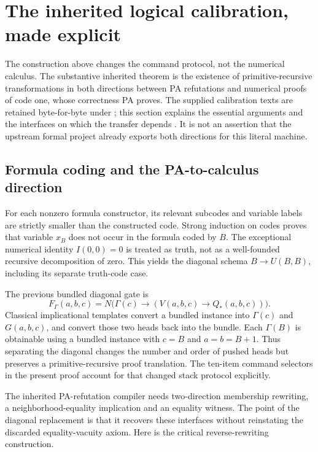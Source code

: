 \section{The inherited logical calibration, made explicit}
\label{sec:calibration}

The construction above changes the command protocol, not the numerical
calculus. The substantive inherited theorem is the existence of
primitive-recursive transformations in both directions between PA
refutations and numerical proofs of code one, whose correctness PA proves.
The supplied calibration texts are retained byte-for-byte under
; this section explains the essential arguments
and the interfaces on which the transfer depends \cite{pa195,pa194,gammad}.
It is not an assertion that the upstream formal project already exports
both directions for this literal machine.

\subsection{Formula coding and the PA-to-calculus direction}

For each nonzero formula constructor, its relevant subcodes and variable
labels are strictly smaller than the constructed code. Strong induction
on codes proves that variable $x_B$ does not occur in the formula coded
by $B$. The exceptional numerical identity $I(0,0)=0$ is treated as truth,
not as a well-founded recursive decomposition of zero. This yields the
diagonal schema $B\to U(B,B)$, including its separate truth-code case.

The previous bundled diagonal gate is
\[
 F_\Gamma(a,b,c)=N\bigl(\Gamma(c)\to(V(a,b,c)\to Q_*(a,b,c))\bigr).
\]
Classical implicational templates convert a bundled instance into
$\Gamma(c)$ and $G(a,b,c)$, and convert those two heads back into the
bundle. Each $\Gamma(B)$ is obtainable using a bundled instance with
$c=B$ and $a=b=B+1$. Thus separating the diagonal changes the number and
order of pushed heads but preserves a primitive-recursive proof
translation. The ten-item command selectors in the present proof account
for that changed stack protocol explicitly.

The inherited PA-refutation compiler needs two-direction membership
rewriting, a neighborhood-equality implication and an equality witness.
The point of the diagonal replacement is that it recovers these interfaces
without reinstating the discarded equality-vacuity axiom. Here is the
critical reverse-rewriting construction.


